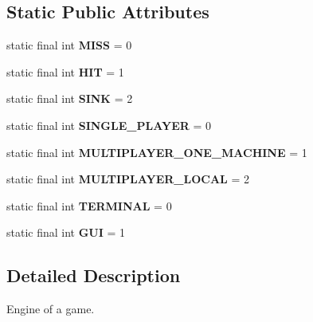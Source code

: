 \subsection*{Static Public Attributes}
\begin{DoxyCompactItemize}
\item 
static final int {\bfseries M\+I\+SS} = 0\hypertarget{classGame_a66375c0a8f7f1a1480bd47221bc31917}{}\label{classGame_a66375c0a8f7f1a1480bd47221bc31917}

\item 
static final int {\bfseries H\+IT} = 1\hypertarget{classGame_a3840c1d15fa897a006516377a7f2e340}{}\label{classGame_a3840c1d15fa897a006516377a7f2e340}

\item 
static final int {\bfseries S\+I\+NK} = 2\hypertarget{classGame_a025eaf2e2b3235687cebe23b45f74467}{}\label{classGame_a025eaf2e2b3235687cebe23b45f74467}

\item 
static final int {\bfseries S\+I\+N\+G\+L\+E\+\_\+\+P\+L\+A\+Y\+ER} = 0\hypertarget{classGame_a5339842157512627a57fd244ddf6fee1}{}\label{classGame_a5339842157512627a57fd244ddf6fee1}

\item 
static final int {\bfseries M\+U\+L\+T\+I\+P\+L\+A\+Y\+E\+R\+\_\+\+O\+N\+E\+\_\+\+M\+A\+C\+H\+I\+NE} = 1\hypertarget{classGame_a154eba714e497a72538c02a4a242e6f0}{}\label{classGame_a154eba714e497a72538c02a4a242e6f0}

\item 
static final int {\bfseries M\+U\+L\+T\+I\+P\+L\+A\+Y\+E\+R\+\_\+\+L\+O\+C\+AL} = 2\hypertarget{classGame_a33173902f263a3da1fcc20039c5270c4}{}\label{classGame_a33173902f263a3da1fcc20039c5270c4}

\item 
static final int {\bfseries T\+E\+R\+M\+I\+N\+AL} = 0\hypertarget{classGame_a5b128fb3114228cd96da20f04a242ece}{}\label{classGame_a5b128fb3114228cd96da20f04a242ece}

\item 
static final int {\bfseries G\+UI} = 1\hypertarget{classGame_a9946b16728ee007ef31ec57e6578d2a2}{}\label{classGame_a9946b16728ee007ef31ec57e6578d2a2}

\end{DoxyCompactItemize}


\subsection{Detailed Description}
Engine of a game. 

